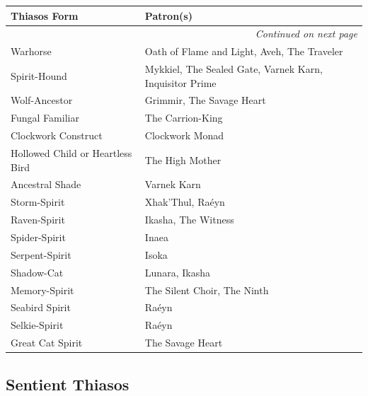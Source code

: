 \begin{longtable}{|p{5cm}|p{11cm}|}
\hline
\textbf{Thiasos Form} & \textbf{Patron(s)} \\
\hline
\endhead
\hline
\multicolumn{2}{|r|}{\textit{Continued on next page}} \\
\endfoot
\hline
\endlastfoot
Warhorse & Oath of Flame and Light, Aveh, The Traveler \\
Spirit-Hound & Mykkiel, The Sealed Gate, Varnek Karn, Inquisitor Prime \\
Wolf-Ancestor & Grimmir, The Savage Heart \\
Fungal Familiar & The Carrion-King \\
Clockwork Construct & Clockwork Monad \\
Hollowed Child or Heartless Bird & The High Mother \\
Ancestral Shade & Varnek Karn \\
Storm-Spirit & Xhak'Thul, Raéyn \\
Raven-Spirit & Ikasha, The Witness \\
Spider-Spirit & Inaea \\
Serpent-Spirit & Isoka \\
Shadow-Cat & Lunara, Ikasha \\
Memory-Spirit & The Silent Choir, The Ninth \\
Seabird Spirit & Raéyn \\
Selkie-Spirit & Raéyn \\
Great Cat Spirit & The Savage Heart \\
\hline
\end{longtable}

\subsection{Sentient Thiasos}

